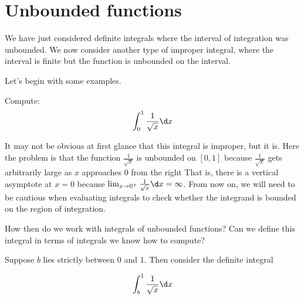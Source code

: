 \documentclass{ximera}
\begin{document}
\section{Unbounded functions}

We have just considered definite integrals where the interval of
integration was unbounded. We now consider another type of improper
integral, where the interval is finite but the function is unbounded on the interval. 




Let's begin with some examples.

\begin{example}	
  Compute:
  \[
  \int_{0}^1 \frac{1}{\sqrt{x}} \d x
  \]
  \begin{explanation}
It may not be obvious at first glance that this integral is improper, but it is.  Here the problem is that the function $\frac{1}{\sqrt{x}}$ is unbounded on $[0,1]$ because $\frac{1}{\sqrt{x}}$ gets arbitrarily large as $x$ approaches $0$ from the right That is, there is a vertical asymptote at $x=0$ because $\lim_{x \to 0^+} \frac{1}{\sqrt{x}} \d x = \infty$. From now on, we will need to be cautious when evaluating integrals to check whether the integrand is bounded on the region of integration. 

How then do we work with integrals of unbounded functions?  Can we define this integral in terms of integrals we know how to compute?

Suppose $b$ lies strictly between $0$ and $1$. Then consider the definite integral

\[
\int_{b}^{1} \frac{1}{\sqrt{x}} \d x
\]

\begin{image}
\end{image}


\end{explanation}
\end{example}
\end{document}
